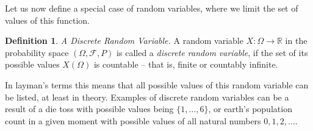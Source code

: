 \documentclass[12pt,a4paper,leqno]{report}
\newcommand{\R}{\mathbb{R}}
\newcommand{\F}{\mathcal{F}}
\theoremstyle{plain}
\theoremstyle{definition}
\newtheorem{maar}[equation]{Definition}
\begin{document}
Let us now define a special case of random variables, where we limit the set of values of this function.

\begin{maar}
\emph{A Discrete Random Variable.}  A random variable $X: \Omega \rightarrow \R$ in the probability space $(\Omega, \F, P)$ is called a \emph{discrete random variable}, if the set of its possible values $X(\Omega)$ is countable -- that is, finite or countably infinite.
\end{maar}

In layman's terms this means that all possible values of this random variable can be listed, at least in theory. Examples of discrete random variables can be a result of a die toss with possible values being $\{1, \ldots, 6\}$, or earth's population count in a given moment with possible values of all natural numbers $0,1,2,\ldots$.
\end{document}
